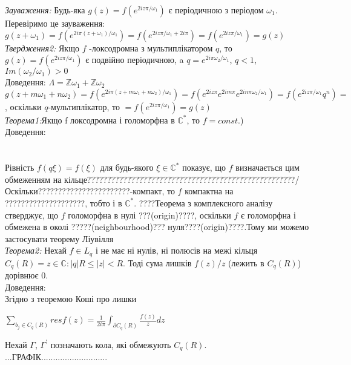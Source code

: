 \documentclass[12pt,a4paper]{article}
\begin{document}
\emph{Зауваження:} Будь-яка $g(z)=f(e^{2iz\pi/\omega_{1}})$ є періодичною з періодом $\omega_{1}$.\\
Перевіримо це зауваження: $g(  z+\omega_{1}  ) = f(  e^{  2i\pi (z+\omega_{1})  / \omega_{1}  }  ) =  f(  e^{  2iz\pi / \omega_{1}  +2i\pi } ) = f(  e^{  2iz\pi / \omega_{1}  } ) = g(z)$ \\

\emph{Твердження2:} Якщо $f$  -локсодромна з мультиплікатором $q$, то  $g(z)=f(e^{2iz\pi/\omega_{1}})$ є подвійно періодичною, a $q=e^{2i\pi \omega_{2}/ \omega_{1}}$, $q<1$, $Im(\omega_{2}/\omega_{1})>0$\\
Доведення: $ \Lambda = \mathbb{Z}\omega_{1} + \mathbb{Z}\omega_{2} $ \\
$g(z+m\omega_{1}+ n\omega_{2})= f(e^{2i\pi(z+m\omega_{1}+ n\omega_{2})/\omega_{1}})=f( e^{2iz\pi}e^{2im\pi}e^{2in\pi\omega_{2} / \omega_{1}} )=f(e^{2iz\pi/\omega_{1}}q^{n})= $, оскільки $q$-мультиплікатор, то
 $=f(e^{2iz\pi/\omega_{1}})=g(z)$\\
 
\emph{Теорема1:}Якщо f локсодромна і голоморфна в $\mathbb{C}^{*}$, то $f=const$.)\\
Доведення:\\
\\
\\

Рівність $f(q\xi)=f(\xi)$ для будь-якого $\xi \in \mathbb{C}^{*}$ показує, що $f$ визначається цим обмеженням на кільце????????????????????????????????????????????????????/ Оскільки???????????????????????-компакт, то $f$ компактна на ????????????????????, тобто і в $\mathbb{C}^{*}$. ????Теорема з комплексного аналізу стверджує, що $f$ голоморфна в нулі ???(origin)????, оскільки $f$ є голоморфна і обмежена в околі ?????(neighbourhood)??? нуля????(origin)????.Тому ми можемо застосувати теорему Ліувілля \\


\emph{Теорема2:} Нехай $f\in L_{q}$ і не має ні нулів, ні полюсів на межі кільця $C_{q}(R)={z\in \mathbb{C}:\left |q  \right |R\leq \left |z  \right |<R }$. Тоді сума лишків $f(z)/z$ (лежить в $C_{q}(R)$) дорівнює $0$.\\
Доведення:\\Згідно з теоремою Коші про лишки\\
\begin{center}
$ \sum_{b_{j}\in C_{q}(R)}^{ } resf(z)= \frac{1}{2i\pi}\int_{\partial C_{q}(R)}^{ } \frac{f(z)}{z}dz$
\end{center}
Нехай $\Gamma$, $\Gamma^{'}$ позначають кола, які обмежують $C_{q}(R)$. ...ГРАФІК............................
\\
\end{document}

